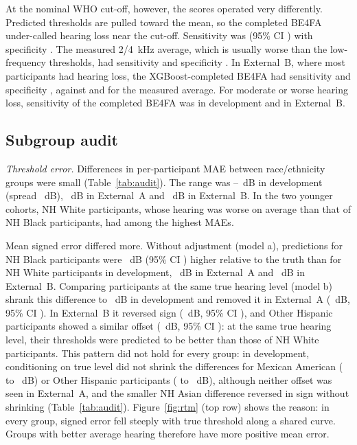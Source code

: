 \documentclass[11pt]{article}
\begin{document}
At the nominal WHO cut-off, however, the scores operated very differently. Predicted thresholds are pulled toward the mean, so the completed BE4FA under-called hearing loss near the cut-off. Sensitivity was \SensXgbTwentyDev{} (95\% CI \SensCiXgbTwentyDev{}) with specificity \SpecXgbTwentyDev{}. The measured 2/4~kHz average, which is usually worse than the low-frequency thresholds, had sensitivity \SensHfaTwentyDev{} and specificity \SpecHfaTwentyDev{}. In External~B, where most participants had hearing loss, the XGBoost-completed BE4FA had sensitivity \SensXgbTwentyExtB{} and specificity \SpecXgbTwentyExtB{}, against \SensHfaTwentyExtB{} and \SpecHfaTwentyExtB{} for the measured average. For moderate or worse hearing loss, sensitivity of the completed BE4FA was \SensXgbThirtyFiveDev{} in development and \SensXgbThirtyFiveExtB{} in External~B.

\subsection*{Subgroup audit}
\emph{Threshold error.} Differences in per-participant MAE between race/ethnicity groups were small (Table~\ref{tab:audit}). The range was \GMaeMinDev{}--\GMaeMaxDev{}~dB in development (spread \GMaeRangeDev{}~dB), \GMaeRangeExtA{}~dB in External~A and \GMaeRangeExtB{}~dB in External~B. In the two younger cohorts, NH White participants, whose hearing was worse on average than that of NH Black participants, had among the highest MAEs.

Mean signed error differed more. Without adjustment (model a), predictions for NH Black participants were \EffRawBlackDev{}~dB (95\% CI \EffCiRawBlackDev{}) higher relative to the truth than for NH White participants in development, \EffRawBlackExtA{}~dB in External~A and \EffRawBlackExtB{}~dB in External~B. Comparing participants at the same true hearing level (model b) shrank this difference to \EffCondBlackDev{}~dB in development and removed it in External~A (\EffCondBlackExtA{}~dB, 95\% CI \EffCiCondBlackExtA{}). In External~B it reversed sign (\EffCondBlackExtB{}~dB, 95\% CI \EffCiCondBlackExtB{}), and Other Hispanic participants showed a similar offset (\EffCondOthHispExtB{}~dB, 95\% CI \EffCiCondOthHispExtB{}): at the same true hearing level, their thresholds were predicted to be better than those of NH White participants. This pattern did not hold for every group: in development, conditioning on true level did not shrink the differences for Mexican American (\EffRawMexAmDev{} to \EffCondMexAmDev{}~dB) or Other Hispanic participants (\EffRawOthHispDev{} to \EffCondOthHispDev{}~dB), although neither offset was seen in External~A, and the smaller NH Asian difference reversed in sign without shrinking (Table~\ref{tab:audit}). Figure~\ref{fig:rtm} (top row) shows the reason: in every group, signed error fell steeply with true threshold along a shared curve. Groups with better average hearing therefore have more positive mean error.
\end{document}
